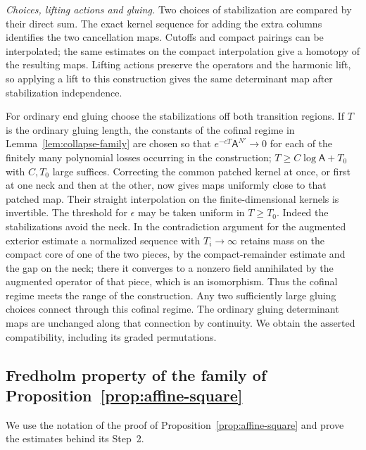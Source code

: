 \documentclass[11pt]{amsart}
\theoremstyle{definition}
\theoremstyle{remark}
\theoremstyle{plain}
\numberwithin{equation}{section}
\begin{document}
\emph{Choices, lifting actions and gluing.} Two choices of stabilization are compared
by their direct sum. The exact kernel sequence for adding the
extra columns identifies the two cancellation maps. Cutoffs and
compact pairings can be interpolated; the same estimates on the
compact interpolation give a homotopy of the resulting maps.
Lifting actions preserve the operators and the harmonic lift,
so applying a lift to this construction gives the same determinant
map after stabilization independence.

For ordinary end gluing choose the stabilizations off both transition
regions. If $T$ is the ordinary gluing length, the constants of the
cofinal regime in Lemma~\ref{lem:collapse-family} are chosen so that
$e^{-cT}\mathsf A^{N'}\to0$ for each of the finitely many polynomial
losses occurring in the construction; $T\ge C\log\mathsf A+T_0$ with
$C,T_0$ large suffices. Correcting the common patched kernel at once, or first at
one neck and then at the other, now gives maps uniformly close
to that patched map. Their straight interpolation on the
finite-dimensional kernels is invertible. The threshold for $\epsilon$
may be taken uniform in $T\ge T_0$. Indeed the stabilizations avoid the
neck. In the contradiction argument for the augmented exterior
estimate a normalized sequence with $T_i\to\infty$ retains mass on the
compact core of one of the two pieces, by the compact-remainder estimate
and the gap on the neck; there it converges to a nonzero field annihilated
by the augmented operator of that piece, which is an isomorphism. Thus
the cofinal regime meets the range of the construction. Any two sufficiently
large gluing choices connect through this cofinal regime. The
ordinary gluing determinant maps are unchanged along that
connection by continuity. We obtain the asserted compatibility,
including its graded permutations.

\subsection{Fredholm property of the family of Proposition~\ref{prop:affine-square}}\label{app:affine-fredholm}
We use the notation of the proof of Proposition~\ref{prop:affine-square}
and prove the estimates behind its Step~2.
\end{document}

